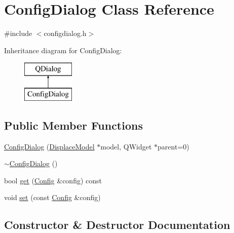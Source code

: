 \hypertarget{class_config_dialog}{}\section{Config\+Dialog Class Reference}
\label{class_config_dialog}


{\ttfamily \#include $<$configdialog.\+h$>$}

Inheritance diagram for Config\+Dialog\+:\begin{figure}[H]
\begin{center}
\leavevmode
\includegraphics[height=2.000000cm]{da/d41/class_config_dialog}
\end{center}
\end{figure}
\subsection*{Public Member Functions}
\begin{DoxyCompactItemize}
\item 
\mbox{\hyperlink{class_config_dialog_a9ab7120d9c755c702dcc7e9ae5b6cc17}{Config\+Dialog}} (\mbox{\hyperlink{class_displace_model}{Displace\+Model}} $\ast$model, Q\+Widget $\ast$parent=0)
\item 
\mbox{\hyperlink{class_config_dialog_a485badac4dffa04603f800bb9d396e1d}{$\sim$\+Config\+Dialog}} ()
\item 
bool \mbox{\hyperlink{class_config_dialog_a7caf87325a4d9d4137e50c3ee5adf63a}{get}} (\mbox{\hyperlink{class_config}{Config}} \&config) const
\item 
void \mbox{\hyperlink{class_config_dialog_ac8481aa32a601a50690ec8c07e48d8e4}{set}} (const \mbox{\hyperlink{class_config}{Config}} \&config)
\end{DoxyCompactItemize}


\subsection{Constructor \& Destructor Documentation}
\mbox{\label{class_config_dialog_a9ab7120d9c755c702dcc7e9ae5b6cc17}} 
